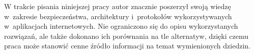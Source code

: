 \documentclass[11pt]{aghdpl}
\begin{document}
W trakcie pisania niniejszej pracy autor znacznie poszerzył swoją wiedzę w~zakresie bezpieczeństwa, architektury i~protokołów wykorzystywanych w~aplikacjach internetowych. Nie ograniczono się do opisu wykorzystanych rozwiązań, ale także dokonano ich porównania na tle alternatyw, dzięki czemu praca może stanowić cenne źródło informacji na temat wymienionych dziedzin.

% 
% 



\end{document}
